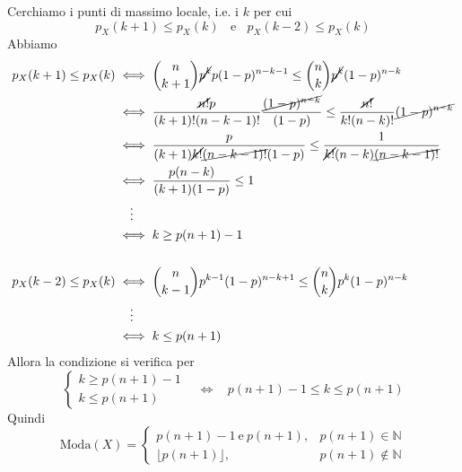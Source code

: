 \begin{enumerate}
Cerchiamo i punti di massimo locale, i.e. i $k$ per cui
\begin{equation*}
\boxed{p_{X}( k+1) \leq p_{X}( k) \ \ \ \ \text{e} \ \ \ \ p_{X}( k-2) \leq p_{X}( k)}
\end{equation*}
Abbiamo
\begin{align*}
p_{X}( k+1) \leq p_{X}( k) & \iff \binom{n}{k+1}\cancel{p^{k}} p( 1-p)^{n-k-1} \leq \binom{n}{k}\cancel{p^{k}}( 1-p)^{n-k}\\
 & \iff \frac{\cancel{n!} p}{( k+1) !( n-k-1) !}\frac{\cancel{( 1-p)^{n-k}}}{( 1-p)} \leq \frac{\cancel{n!}}{k!( n-k) !}\cancel{( 1-p)^{n-k}}\\
 & \iff \frac{p}{( k+1)\cancel{k!}\cancel{( n-k-1) !}( 1-p)} \leq \frac{1}{\cancel{k!}( n-k)\cancel{( n-k-1) !}}\\
 & \iff \frac{p( n-k)}{( k+1)( 1-p)} \leq 1\\
 & \quad\vdots \\
 & \iff k\geq p( n+1) -1\\
 & \\
p_{X}( k-2) \leq p_{X}( k) & \iff \binom{n}{k-1} p^{k-1}( 1-p)^{n-k+1} \leq \binom{n}{k} p^{k}( 1-p)^{n-k}\\
 & \quad\vdots \\
 & \iff k\leq p( n+1)
\end{align*}
Allora la condizione si verifica per
\begin{equation*}
\begin{cases}
k\geq p( n+1) -1\\
k\leq p( n+1)
\end{cases}
 \ \ \ \ \iff \ \ \ \ p( n+1) -1\leq k\leq p( n+1)
\end{equation*}
Quindi
\begin{equation*}
\text{Moda}( X) =
\begin{cases}
p( n+1) -1\ \text{e} \ p( n+1) , & p( n+1) \in \mathbb{N}\\
\lfloor p( n+1)\rfloor , & p( n+1) \notin \mathbb{N}
\end{cases}
\end{equation*}
\end{enumerate}

\Soluzione

